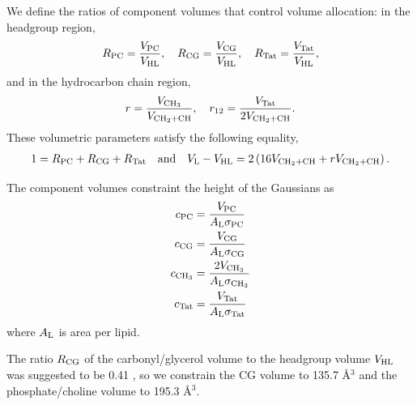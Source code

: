 We define the ratios of component volumes that control volume allocation:
in the headgroup region,
\begin{equation}
  R_\textrm{PC}=\frac{V_\textrm{PC}}{V_\textrm{HL}}, \quad R_\textrm{CG}=\frac{V_\textrm{CG}}{V_\textrm{HL}}, \quad R_\textrm{Tat}=\frac{V_\textrm{Tat}}{V_\textrm{HL}},
\end{equation}
and in the hydrocarbon chain region, 
\begin{equation}
  r=\frac{V_{\textrm{CH}_3}}{V_{\textrm{CH}_2+\textrm{CH}}}, \quad r_{12}=\frac{V_\textrm{Tat}}{2V_{\textrm{CH}_2+\textrm{CH}}}.
\end{equation}
These volumetric parameters satisfy the following equality,
\begin{align}
  1 = R_\textrm{PC} + R_\textrm{CG} + R_\textrm{Tat} \quad\text{and}\quad V_\textrm{L} - V_\textrm{HL} = 2\left(16V_{\textrm{CH}_2+\textrm{CH}} + rV_{\textrm{CH}_2+\textrm{CH}}\right).
\end{align}

The component volumes constraint the height of the Gaussians as
\begin{align}
  c_\textrm{PC} &= \frac{V_\textrm{PC}}{A_\textrm{L}\sigma_\textrm{PC}} \\
  c_\textrm{CG} &= \frac{V_\textrm{CG}}{A_\textrm{L}\sigma_\textrm{CG}} \\
  c_{\textrm{CH}_3} &= \frac{2V_{\textrm{CH}_3}}{A_\textrm{L}\sigma_{\textrm{CH}_3}} \\
  c_\textrm{Tat} &= \frac{V_\textrm{Tat}}{A_\textrm{L}\sigma_\textrm{Tat}}
\end{align}
where $A_\textrm{L}$ is area per lipid.

The ratio $R_\textrm{CG}$ of 
the carbonyl/glycerol volume to the headgroup volume $V_\textrm{HL}$ was
suggested to be 0.41 \cite{ref:Braun13}, so we constrain the CG
volume to 135.7 \AA$^3$ and the phosphate/choline volume to 
195.3 \AA$^3$. 

